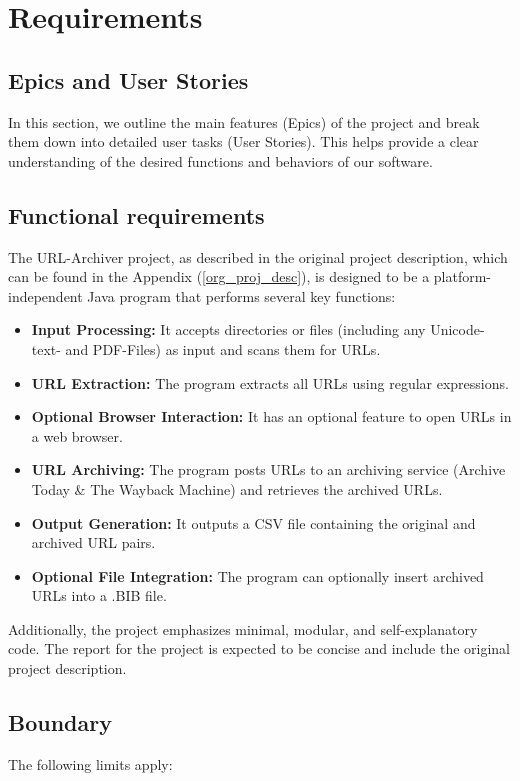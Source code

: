\section{Requirements}

\subsection{Epics and User Stories}
In this section, we outline the main features (Epics) of the project and break them down into detailed user tasks (User Stories). This helps provide a clear understanding of the desired functions and behaviors of our software.





\clearpage
\subsection{Functional requirements}
The URL-Archiver project, as described in the original project description, which can be found in the Appendix (\ref{org_proj_desc}), is designed to be a platform-independent Java program that performs several key functions:

\begin{itemize}
    \item \textbf{Input Processing:} It accepts directories or files (including any Unicode-text- and PDF-Files) as input and scans them for URLs.
    \item \textbf{URL Extraction:} The program extracts all URLs using regular expressions.
    \item \textbf{Optional Browser Interaction:} It has an optional feature to open URLs in a web browser.
    \item \textbf{URL Archiving:} The program posts URLs to an archiving service (Archive Today \& The Wayback Machine) and retrieves the archived URLs.
    \item \textbf{Output Generation:} It outputs a CSV file containing the original and archived URL pairs.
    \item \textbf{Optional File Integration:} The program can optionally insert archived URLs into a .BIB file.
\end{itemize}

Additionally, the project emphasizes minimal, modular, and self-explanatory code. The report for the project is expected to be concise and include the original project description.

\subsection{Boundary}
The following limits apply:


